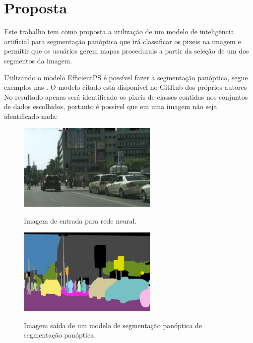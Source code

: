\section{Proposta}

Este trabalho tem como proposta a utilização de um modelo de inteligência artificial para segmentação panóptica que irá classificar os pixeis na imagem e permitir que os usuários gerem mapas procedurais a partir da seleção de um dos segmentos da imagem.

Utilizando o modelo EfficientPS é possível fazer a segmentação panóptica, segue exemplos nas . O modelo citado está disponível no GitHub dos próprios autores \space{}
 No resultado apenas será identificado os pixeis de classes contidas nos conjuntos de dados escolhidos, portanto é possível que em uma imagem não seja identificado nada:

\begin{figure}[!ht]
	\centering
    \caption{Imagem de entrada para rede neural.}
	\includegraphics[width=0.6\textwidth]{figures/segmantations_1.png}
	\label{fig:segmantations_1}
\end{figure}

\begin{figure}[!ht]
	\centering
    \caption{Imagem saída de um modelo de segmentação panóptica de segmentação panóptica.}
	\includegraphics[width=0.6\textwidth]{figures/segmantations_2.png}
	\label{fig:segmantations_2}
\end{figure}

